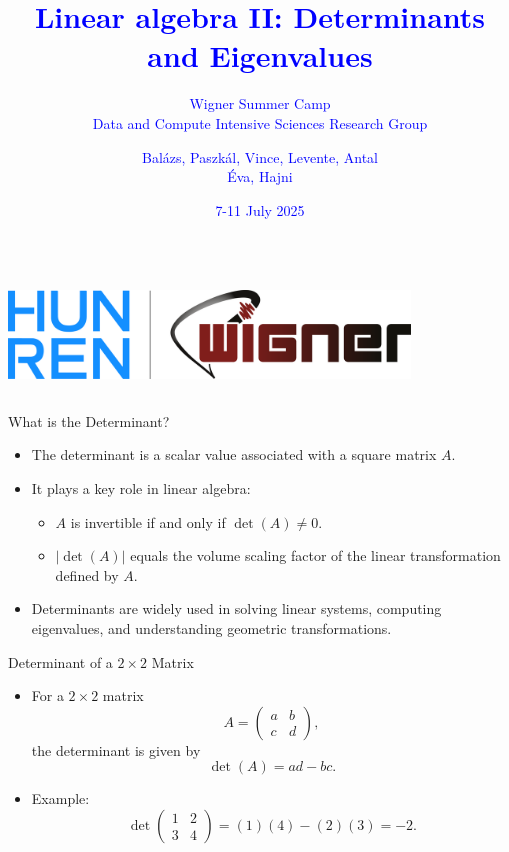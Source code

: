 \documentclass{beamer}
\title{\textcolor{blue}{Linear algebra II: Determinants and Eigenvalues}}
\subtitle{\textcolor{blue}{Wigner Summer Camp \\ Data and Compute Intensive Sciences Research Group}}
\author{\textcolor{blue}{Balázs, Paszkál, Vince, Levente, Antal \\ Éva, Hajni}}
\date{\textcolor{blue}{7-11 July 2025}}
\begin{document}
	\begin{frame}
		\titlepage
		\begin{columns}
			\centering
			\centering
			\includegraphics[width=0.8\textwidth]{../img/logo.png}
			\centering
		\end{columns}
	\end{frame}

	\begin{frame}{What is the Determinant?}
		\begin{itemize}
		  \item The determinant is a scalar value associated with a square matrix \( A \).
		  \item It plays a key role in linear algebra:
		  \begin{itemize}
		    \item \( A \) is invertible if and only if \( \det(A) \neq 0 \).
		    \item \( |\det(A)| \) equals the volume scaling factor of the linear transformation defined by \( A \).
		  \end{itemize}
		  \item Determinants are widely used in solving linear systems, computing eigenvalues, and understanding geometric transformations.
		\end{itemize}
	\end{frame}

	\begin{frame}{Determinant of a \(2 \times 2\) Matrix}
		\begin{itemize}
		  \item For a \(2 \times 2\) matrix
		  \begin{equation}
		    A =
		    \begin{pmatrix} a & b \\ c & d \end{pmatrix},
		  \end{equation}
		  the determinant is given by
		  \begin{equation}
		    \det(A) = ad - bc. \label{eq:det2x2}
		  \end{equation}
		  \item Example:
		  \begin{equation}
		    \det
		    \begin{pmatrix} 1 & 2 \\ 3 & 4 \end{pmatrix} =
		    (1)(4) - (2)(3) = -2. \label{eq:det2x2_example}
		  \end{equation}
		\end{itemize}
	\end{frame}
\end{document}
